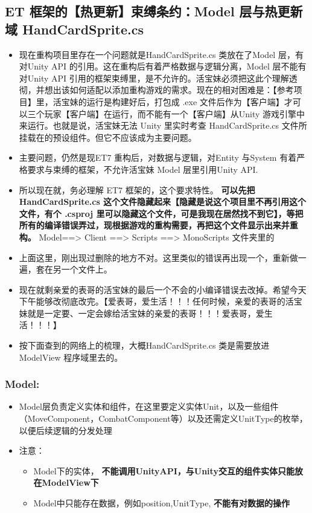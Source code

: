 \documentclass[9pt, b5paper]{article}
\begin{document}
\subsection{ET 框架的【热更新】束缚条约：Model 层与热更新域 HandCardSprite.cs}
\label{sec-8-12}
\begin{itemize}
\item 现在重构项目里存在一个问题就是HandCardSprite.cs 类放在了Model 层，有对Unity API 的引用。这在重构后有着严格数据与逻辑分离，Model 层不能有对Unity API 引用的框架束缚里，是不允许的。活宝妹必须把这此个理解透彻，并想出该如何适配以添加重构游戏的需求。现在的相对困难是：【参考项目】里，活宝妹的运行是构建好后，打包成 .exe 文件后作为【客户端】才可以三个玩家【客户端】在运行，而不能有一个【客户端】从Unity 游戏引擎中来运行。也就是说，活宝妹无法 Unity 里实时考查 HandCardSprite.cs 文件所挂载在的预设组件。但它不应该成为主要问题。
\item 主要问题，仍然是现ET7 重构后，对数据与逻辑，对Entity 与System 有着严格要求与束缚的框架，不允许活宝妹 Model 层里引用Unity API.
\item 所以现在就，务必理解 ET7 框架的，这个要求特性。 \textbf{可以先把HandCardSprite.cs 这个文件隐藏起来【隐藏是说这个项目里不再引用这个文件，有个 .csproj 里可以隐藏这个文件，可是我现在居然找不到它】，等把所有的编译错误弄过，现根据游戏的重构需要，再把这个文件显示出来并重构。} Model==> Client ==> Scripts ==> MonoScripts 文件夹里的
\item 上面这里，刚出现过删除的地方不对。这里类似的错误再出现一个，重新做一遍，套在另一个文件上。
\item 现在就剩亲爱的表哥的活宝妹的最后一个不会的小编译错误去改掉。希望今天下午能够改彻底改完。【爱表哥，爱生活！！！任何时候，亲爱的表哥的活宝妹就是一定要、一定会嫁给活宝妹的亲爱的表哥！！！爱表哥，爱生活！！！】
\item 按下面查到的网络上的梳理，大概HandCardSprite.cs 类是需要放进ModelView 程序域里去的。
\end{itemize}
\subsubsection{Model:}
\label{sec-8-12-1}
\begin{itemize}
\item Model层负责定义实体和组件，在这里要定义实体Unit，以及一些组件（MoveComponent，CombatComponent等）以及还需定义UnitType的枚举，以便后续逻辑的分发处理
\item 注意：
\begin{itemize}
\item Model下的实体， \textbf{不能调用UnityAPI，与Unity交互的组件实体只能放在ModelView下}
\item Model中只能存在数据，例如position,UnitType, \textbf{不能有对数据的操作}
\end{itemize}
\end{itemize}
\end{document}
